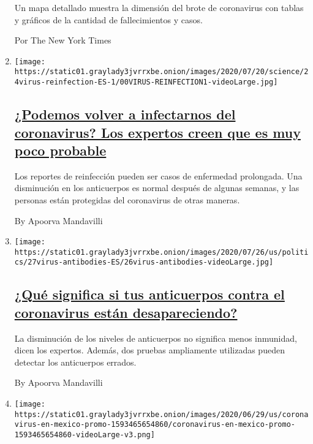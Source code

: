 \begin{enumerate}
  Un mapa detallado muestra la dimensión del brote de coronavirus con
  tablas y gráficos de la cantidad de fallecimientos y casos.

  Por The New York Times
\item
  \texttt{[image: https://static01.graylady3jvrrxbe.onion/images/2020/07/20/science/24virus-reinfection-ES-1/00VIRUS-REINFECTION1-videoLarge.jpg]}

  \hypertarget{podemos-volver-a-infectarnos-del-coronavirus-los-expertos-creen-que-es-muy-poco-probable}{%
  \subsection{\texorpdfstring{\href{/es/2020/07/24/espanol/ciencia-y-tecnologia/reinfeccion-coronavirus.html}{¿Podemos
  volver a infectarnos del coronavirus? Los expertos creen que es muy
  poco
  probable}}{¿Podemos volver a infectarnos del coronavirus? Los expertos creen que es muy poco probable}}\label{podemos-volver-a-infectarnos-del-coronavirus-los-expertos-creen-que-es-muy-poco-probable}}

  Los reportes de reinfección pueden ser casos de enfermedad prolongada.
  Una disminución en los anticuerpos es normal después de algunas
  semanas, y las personas están protegidas del coronavirus de otras
  maneras.

  By Apoorva Mandavilli
\item
  \texttt{[image: https://static01.graylady3jvrrxbe.onion/images/2020/07/26/us/politics/27virus-antibodies-ES/26virus-antibodies-videoLarge.jpg]}

  \hypertarget{quuxe9-significa-si-tus-anticuerpos-contra-el-coronavirus-estuxe1n-desapareciendo}{%
  \subsection{\texorpdfstring{\href{/es/2020/07/28/espanol/ciencia-y-tecnologia/anticuerpos-coronavirus-inmunidad.html}{¿Qué
  significa si tus anticuerpos contra el coronavirus están
  desapareciendo?}}{¿Qué significa si tus anticuerpos contra el coronavirus están desapareciendo?}}\label{quuxe9-significa-si-tus-anticuerpos-contra-el-coronavirus-estuxe1n-desapareciendo}}

  La disminución de los niveles de anticuerpos no significa menos
  inmunidad, dicen los expertos. Además, dos pruebas ampliamente
  utilizadas pueden detectar los anticuerpos errados.

  By Apoorva Mandavilli
\item
  \texttt{[image: https://static01.graylady3jvrrxbe.onion/images/2020/06/29/us/coronavirus-en-mexico-promo-1593465654860/coronavirus-en-mexico-promo-1593465654860-videoLarge-v3.png]}


\end{enumerate}
